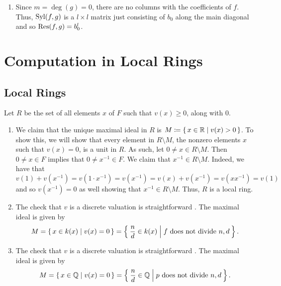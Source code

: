 \documentclass[letterpaper, 11pt, oneside]{book}
\begin{document}
\begin{sol}\label{ex:UAG_3.1.7}
\end{sol}

\begin{sol}\label{ex:UAG_3.1.8}
  \begin{enumerate}
    \item Since $m = \deg(g) = 0$, there are no columns with the coefficients of $f$.
          Thus, $\operatorname{Syl}(f, g)$ is a $l \times l$ matrix just consisting of $b_{0}$ along the main diagonal and so $\Res(f, g) = b_{0}^{l}$.
  \end{enumerate}
\end{sol}

\chapter{Computation in Local Rings}

\section{Local Rings}

\begin{sol}\label{ex:UAG_4.1.6}
  Let $R$ be the set of all elements $x$ of $F$ such that $v(x) \geq 0$, along with $0$.
  \begin{enumerate}
    \item We claim that the unique maximal ideal in $R$ is $M \coloneqq \set{x \in \mathbb{R}| v(x) > 0}$.
          To show this, we will show that every element in $R \setminus M$, the nonzero elements $x$ such that $v(x) = 0$, is a unit in $R$.
          As such, let $0 \neq x \in R \setminus M$.
          Then $0 \neq x \in F$ implies that $0 \neq x^{-1} \in F$.
          We claim that $x^{-1} \in R \setminus M$.
          Indeed, we have that
          \[
            v(1) + v(x^{-1}) = v(1 \cdot x^{-1}) = v(x^{-1}) = v(x) + v(x^{-1}) = v(xx^{-1}) = v(1)
          \]
          and so $v(x^{-1}) = 0$ as well showing that $x^{-1} \in R \setminus M$.
          Thus, $R$ is a local ring.
    \item The check that $v$ is a discrete valuation is straightforward .
          The maximal ideal is given by
          \[
            M = \set{x \in k(x) | v(x) = 0} = \Set{\frac{n}{d} \in k(x) | f \text{ does not divide } n, d}.
          \]
    \item The check that $v$ is a discrete valuation is straightforward .
          The maximal ideal is given by
          \[
            M = \set{x \in \mathbb{Q}| v(x) = 0} = \Set{\frac{n}{d} \in \mathbb{Q}| p \text{ does not divide } n, d}.
          \]
  \end{enumerate}
\end{sol}
\end{document}
